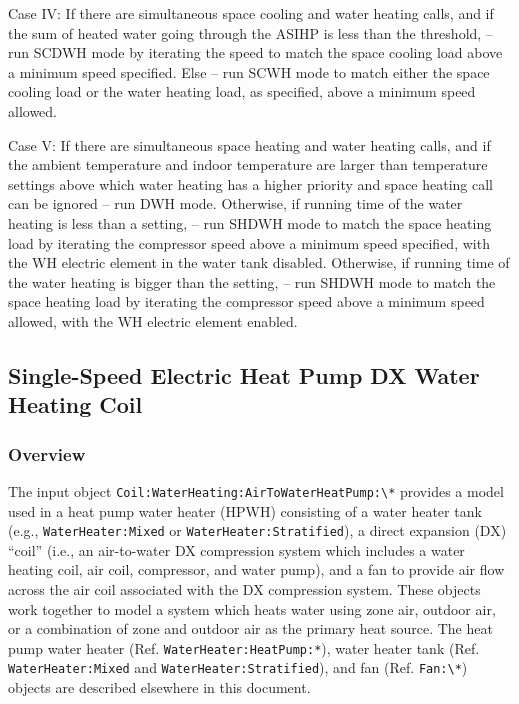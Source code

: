 Case IV:
If there are simultaneous space cooling and water heating calls, and if the sum of heated water going through the ASIHP is less than the threshold, – run SCDWH mode by iterating the speed to match the space cooling load above a minimum speed specified.
Else – run SCWH mode to match either the space cooling load or the water heating load, as specified, above a minimum speed allowed.

Case V: 
If there are simultaneous space heating and water heating calls, and if the ambient temperature and indoor temperature are larger than temperature settings above which water heating has a higher priority and space heating call can be ignored – run DWH mode.
Otherwise, if running time of the water heating is less than a setting, – run SHDWH mode to match the space heating load by iterating the compressor speed above a minimum speed specified, with the WH electric element in the water tank disabled.
Otherwise, if running time of the water heating is bigger than the setting, – run SHDWH mode to match the space heating load by iterating the compressor speed above a minimum speed allowed, with the WH electric element enabled.




\subsection{Single-Speed Electric Heat Pump DX Water Heating Coil}\label{single-speed-electric-heat-pump-dx-water-heating-coil}

\subsubsection{Overview}\label{overview-11}

The input object \lstinline!Coil:WaterHeating:AirToWaterHeatPump:\*! provides a model used in a heat pump water heater (HPWH) consisting of a water heater tank (e.g., \lstinline!WaterHeater:Mixed! or \lstinline!WaterHeater:Stratified!), a direct expansion (DX) ``coil'' (i.e., an air-to-water DX compression system which includes a water heating coil, air coil, compressor, and water pump), and a fan to provide air flow across the air coil associated with the DX compression system. These objects work together to model a system which heats water using zone air, outdoor air, or a combination of zone and outdoor air as the primary heat source. The heat pump water heater (Ref. \lstinline!WaterHeater:HeatPump:*!), water heater tank (Ref. \lstinline!WaterHeater:Mixed! and \lstinline!WaterHeater:Stratified!), and fan (Ref. \lstinline!Fan:\*!) objects are described elsewhere in this document.

